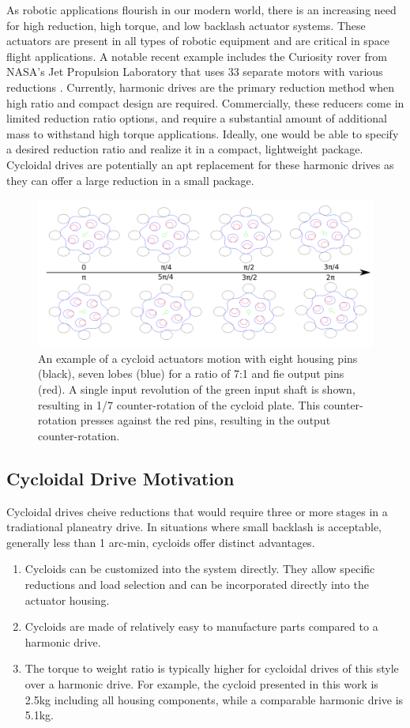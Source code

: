 As robotic applications flourish in our modern world, there is an increasing need for high reduction, high torque, and low backlash actuator systems.
These actuators are present in all types of robotic equipment and are critical in space flight applications.
A notable recent example includes the Curiosity rover from NASA's Jet Propulsion Laboratory that uses 33 separate motors with various reductions \cite{curiosity}.
Currently, harmonic drives are the primary reduction method when high ratio and compact design are required.
Commercially, these reducers come in limited reduction ratio options, and require a substantial amount of additional mass to withstand high torque applications.
Ideally, one would be able to specify a desired reduction ratio and realize it in a compact, lightweight package. 
Cycloidal drives are potentially an apt replacement for these harmonic drives as they can offer a large reduction in a small package.

\begin{figure}[t]
	\centering
	\includegraphics[width=0.8\linewidth]{images/single_motion}
	\caption{An example of a cycloid actuators motion with eight housing pins (black), seven lobes (blue) for a ratio of 7:1 and fie output pins (red). A single input revolution of the green input shaft is shown, resulting in 1/7 counter-rotation of the cycloid plate. This counter-rotation presses against the red pins, resulting in the output counter-rotation. 
	}
	\label{cycloid_motion}
\end{figure}


\subsection{Cycloidal Drive Motivation}

Cycloidal drives cheive reductions that would require three or more stages in a tradiational planeatry drive. 
In situations where small backlash is acceptable, generally less than 1 arc-min, cycloids offer distinct advantages.

\begin{enumerate}
\item
Cycloids can be customized into the system directly. They allow specific reductions and load selection and can be incorporated directly into the actuator housing.
\item
Cycloids are made of relatively easy to manufacture parts compared to a harmonic drive.
\item
The torque to weight ratio is typically higher for cycloidal drives of this style over a harmonic drive.
For example, the cycloid presented in this work is 2.5kg including all housing components, while a comparable harmonic drive is 5.1kg.
\end{enumerate}

